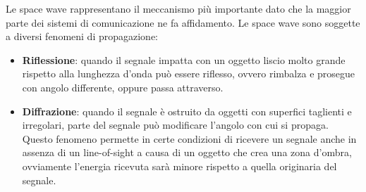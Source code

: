 Le space wave rappresentano il meccanismo più importante dato che la maggior parte dei sistemi di comunicazione ne fa affidamento. Le space wave sono soggette a diversi fenomeni di propagazione:
\begin{itemize}
    \item \textbf{Riflessione}: quando il segnale impatta con un oggetto liscio molto grande rispetto alla lunghezza d'onda può essere riflesso, ovvero rimbalza e prosegue con angolo differente, oppure passa attraverso.
          \begin{center}
          \end{center}





    \item \textbf{Diffrazione}: quando il segnale è ostruito da oggetti con superfici taglienti e irregolari, parte del segnale può modificare l'angolo con cui si propaga. Questo fenomeno permette in certe condizioni di ricevere un segnale anche in assenza di un line-of-sight a causa di un oggetto che crea una zona d'ombra, ovviamente l'energia ricevuta sarà minore rispetto a quella originaria del segnale.
          \begin{center}
          \end{center}




\end{itemize}
